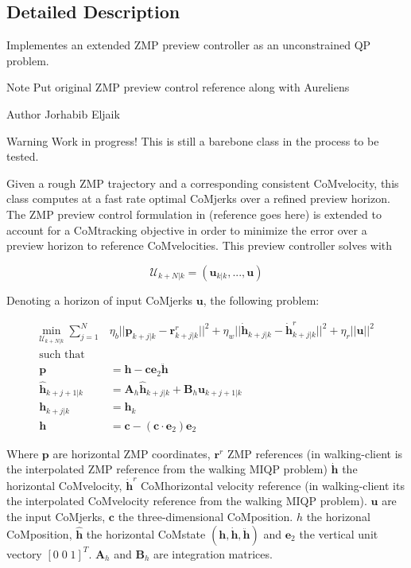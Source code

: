 \subsection{Detailed Description}
Implementes an extended Z\+MP preview controller as an unconstrained QP problem. 

\begin{DoxyNote}{Note}
Put original Z\+MP preview control reference along with Aurelien\textquotesingle{}s
\end{DoxyNote}
\begin{DoxyAuthor}{Author}
Jorhabib Eljaik
\end{DoxyAuthor}
\cite{ibanezThesis2015}

\begin{DoxyWarning}{Warning}
Work in progress! This is still a barebone class in the process to be tested.
\end{DoxyWarning}
Given a rough Z\+MP trajectory and a corresponding consistent Co\+Mvelocity, this class computes at a fast rate optimal Co\+Mjerks over a refined preview horizon. The Z\+MP preview control formulation in (reference goes here) is extended to account for a Co\+Mtracking objective in order to minimize the error over a preview horizon to reference Co\+Mvelocities. This preview controller solves with

\[ \mathcal{U}_{k+N|k} = (\mathbf{u}_{k|k}, ... , \mathbf{u}) \]

Denoting a horizon of input Co\+Mjerks $\mathbf{u}$, the following problem\+:

\begin{align*} \underset{\mathcal{U}_{k+N|k}}{\text{min}} \; \sum_{j=1}^{N} & \eta_b || \mathbf{p}_{k+j|k} - \mathbf{r}_{k+j|k}^r ||^2 + \eta_w ||\mathbf{\dot{h}}_{k+j|k} - \dot{\mathbf{h}}^r_{k+j|k} ||^2 + \eta_r || \mathbf{u} ||^2 \\ \text{such that}&\\ \mathbf{p} &= \mathbf{h} - \mathbf{c}\mathbf{e}_2 \mathbf{\ddot{h}} \\ \mathbf{\hat{h}}_{k+j+1|k} &= \mathbf{A}_h \hat{\mathbf{h}}_{k+j|k} + \mathbf{B}_h \mathbf{u}_{k+j+1|k} \\ \mathbf{h}_{k+j|k} &= \mathbf{h}_k\\ \mathbf{h} &= \mathbf{c} - (\mathbf{c}\cdot\mathbf{e}_2)\mathbf{e}_2 \end{align*}

Where $\mathbf{p}$ are horizontal Z\+MP coordinates, $ \mathbf{r}^r $ Z\+MP references (in walking-\/client is the interpolated Z\+MP reference from the walking M\+I\+QP problem) $ \mathbf{\dot{h}} $ the horizontal Co\+Mvelocity, $ \mathbf{\dot{h}}^r $ Co\+Mhorizontal velocity reference (in walking-\/client it\textquotesingle{}s the interpolated Co\+Mvelocity reference from the walking M\+I\+QP problem). $\mathbf{u}$ are the input Co\+Mjerks, $\mathbf{c}$ the three-\/dimensional Co\+Mposition. $h$ the horizonal Co\+Mposition, $\hat{\mathbf{h}}$ the horizontal Co\+Mstate $ (\mathbf{h}, \mathbf{\dot{h}}, \mathbf{\ddot{h}}) $ and $\mathbf{e}_2$ the vertical unit vectory $ [0\;0\;1]^T$. $\mathbf{A}_h$ and $\mathbf{B}_h$ are integration matrices.

